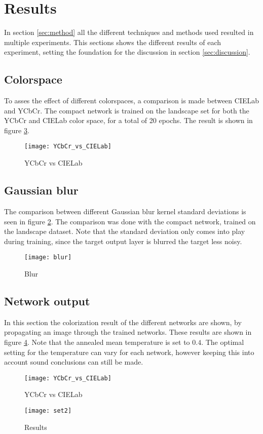 \section{Results}\label{sec:results}

In section \ref{sec:method} all the different techniques and methods used resulted in multiple experiments. This sections shows the different results of each experiment, setting the foundation for the discussion in section \ref{sec:discussion}.

\subsection{Colorspace}
To asses the effect of different colorspaces, a comparison is made between CIELab and YCbCr. The compact network is trained on the landscape set for both the YCbCr and CIELab color space, for a total of 20 epochs. The result is shown in figure \ref{fig:YCbCr_vs_CIELab}.

\begin{figure}[h!]
	\centering
	\texttt{[image: YCbCr\_vs\_CIELab]}
	\caption{YCbCr vs CIELab}
	\label{fig:YCbCr_vs_CIELab}
\end{figure}

\subsection{Gaussian blur}
The comparison between different Gaussian blur kernel standard deviations is seen in figure \ref{fig:blur}. The comparison was done with the compact network, trained on the landscape dataset. Note that the standard deviation only comes into play during training, since the target output layer is blurred the target less noisy. 

\begin{figure}[h]
	\centering
	\texttt{[image: blur]}
	\caption{Blur}
	\label{fig:blur}
\end{figure}

\subsection{Network output}
In this section the colorization result of the different networks are shown, by propagating an image through the trained networks. These results are shown in figure \ref{fig:results}. Note that the annealed mean temperature is set to $0.4$. The optimal setting for the temperature can vary for each network, however keeping this into account sound conclusions can still be made. 
\begin{figure}[h]
	\centering
	\texttt{[image: YCbCr\_vs\_CIELab]}
	\caption{YCbCr vs CIELab}
	\label{fig:YCbCr_vs_CIELab}
\end{figure}

\begin{figure}[h]
	\centering
	\texttt{[image: set2]}
	\caption{Results}
	\label{fig:results}
\end{figure}



